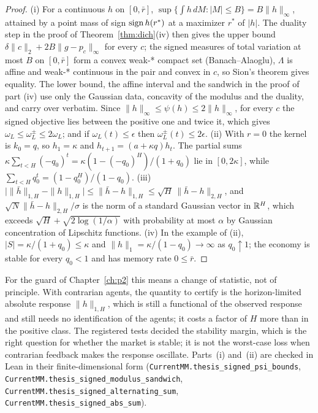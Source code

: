 \begin{proof}
(i) For a continuous $h$ on $[0,\bar r]$, $\sup\{\int h\,dM:|M|\le B\}=B\|h\|_\infty$, attained by a point mass of sign ${\rm sign}\,h(r^*)$ at a maximizer $r^*$ of $|h|$. The duality step in the proof of Theorem~\ref{thm:dich}(iv) then gives the upper bound $\delta\|c\|_2+2B\|g-p_c\|_\infty$ for every $c$; the signed measures of total variation at most $B$ on $[0,\bar r]$ form a convex weak-* compact set (Banach--Alaoglu), $\Lambda$ is affine and weak-* continuous in the pair and convex in $c$, so Sion's theorem gives equality. The lower bound, the affine interval and the sandwich in the proof of part (iv) use only the Gaussian data, concavity of the modulus and the duality, and carry over verbatim. Since $\|h\|_\infty\le\psi(h)\le2\|h\|_\infty$, for every $c$ the signed objective lies between the positive one and twice it, which gives $\omega_L\le\omega^\pm_L\le2\omega_L$; and if $\omega_L(t)\le\epsilon$ then $\omega^\pm_L(t)\le2\epsilon$. (ii) With $r=0$ the kernel is $k_0=q$, so $h_1=\kappa$ and $h_{t+1}=(a+\kappa q)h_t$. The partial sums $\kappa\sum_{t<H}(-q_0)^t=\kappa(1-(-q_0)^H)/(1+q_0)$ lie in $[0,2\kappa]$, while $\sum_{t<H}q_0^t=(1-q_0^H)/(1-q_0)$. (iii) $\big|\|\bar h\|_{1,H}-\|h\|_{1,H}\big|\le\|\bar h-h\|_{1,H}\le\sqrt H\,\|\bar h-h\|_{2,H}$, and $\sqrt N\|\bar h-h\|_{2,H}/\sigma$ is the norm of a standard Gaussian vector in $\mathbb{R}^H$, which exceeds $\sqrt H+\sqrt{2\log(1/\alpha)}$ with probability at most $\alpha$ by Gaussian concentration of Lipschitz functions. (iv) In the example of (ii), $|S|=\kappa/(1+q_0)\le\kappa$ and $\|h\|_1=\kappa/(1-q_0)\to\infty$ as $q_0\uparrow1$; the economy is stable for every $q_0<1$ and has memory rate $0\le\bar r$.
\end{proof}

For the guard of Chapter~\ref{ch:p2} this means a change of statistic, not of principle. With contrarian agents, the quantity to certify is the horizon-limited absolute response $\|h\|_{1,H}$, which is still a functional of the observed response and still needs no identification of the agents; it costs a factor of $H$ more than in the positive class. The registered tests decided the stability margin, which is the right question for whether the market is stable; it is not the worst-case loss when contrarian feedback makes the response oscillate. Parts~(i) and~(ii) are checked in Lean in their finite-dimensional form (\nolinkurl{CurrentMM.thesis_signed_psi_bounds}, \nolinkurl{CurrentMM.thesis_signed_modulus_sandwich}, \nolinkurl{CurrentMM.thesis_signed_alternating_sum}, \nolinkurl{CurrentMM.thesis_signed_abs_sum}).

